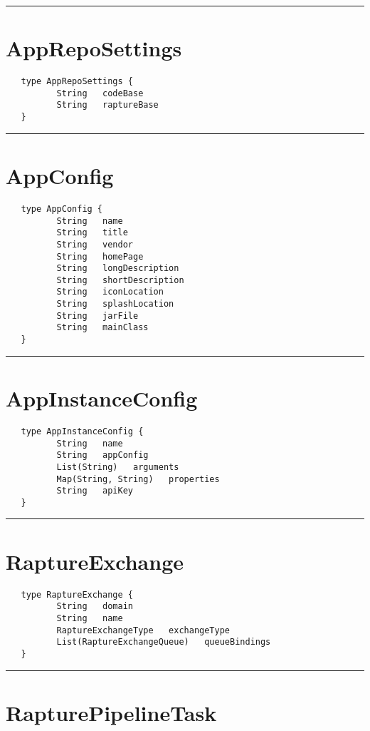 \rule{15cm}{2pt}
\section{AppRepoSettings}
\label{type:AppRepoSettings}

\begin{verbatim}
   type AppRepoSettings {
          String   codeBase
          String   raptureBase
   }
\end{verbatim}

\rule{15cm}{2pt}
\section{AppConfig}
\label{type:AppConfig}

\begin{verbatim}
   type AppConfig {
          String   name
          String   title
          String   vendor
          String   homePage
          String   longDescription
          String   shortDescription
          String   iconLocation
          String   splashLocation
          String   jarFile
          String   mainClass
   }
\end{verbatim}

\rule{15cm}{2pt}
\section{AppInstanceConfig}
\label{type:AppInstanceConfig}

\begin{verbatim}
   type AppInstanceConfig {
          String   name
          String   appConfig
          List(String)   arguments
          Map(String, String)   properties
          String   apiKey
   }
\end{verbatim}

\rule{15cm}{2pt}
\section{RaptureExchange}
\label{type:RaptureExchange}

\begin{verbatim}
   type RaptureExchange {
          String   domain
          String   name
          RaptureExchangeType   exchangeType
          List(RaptureExchangeQueue)   queueBindings
   }
\end{verbatim}

\rule{15cm}{2pt}
\section{RapturePipelineTask}
\label{type:RapturePipelineTask}

